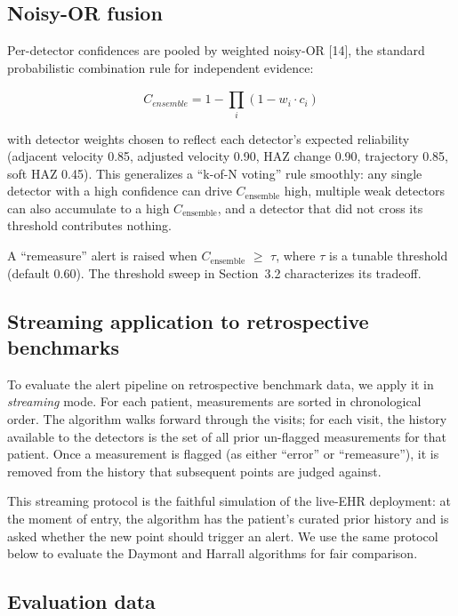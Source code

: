 \documentclass[11pt]{article}
\begin{document}
\subsection{Noisy-OR fusion}\label{noisy-or-fusion}

Per-detector confidences are pooled by weighted noisy-OR [14], the standard probabilistic combination rule for independent evidence:

\[C_{ensemble} = 1 - \prod_{i}^{}\left( 1 - w_{i} \cdot c_{i} \right)\]

with detector weights chosen to reflect each detector's expected reliability (adjacent velocity 0.85, adjusted velocity 0.90, HAZ change 0.90, trajectory 0.85, soft HAZ 0.45). This generalizes a ``k-of-N voting'' rule smoothly: any single detector with a high confidence can drive \(C_{\mathrm{ensemble}}\) high, multiple weak detectors can also accumulate to a high \(C_{\mathrm{ensemble}}\), and a detector that did not cross its threshold contributes nothing.

A ``remeasure'' alert is raised when \(C_{\mathrm{ensemble}}\) \(\ge\) \(\tau\), where \(\tau\) is a tunable threshold (default 0.60). The threshold sweep in Section~3.2 characterizes its tradeoff.

\subsection{Streaming application to retrospective benchmarks}\label{streaming-application-to-retrospective-benchmarks}

To evaluate the alert pipeline on retrospective benchmark data, we apply it in \emph{streaming} mode. For each patient, measurements are sorted in chronological order. The algorithm walks forward through the visits; for each visit, the history available to the detectors is the set of all prior un-flagged measurements for that patient. Once a measurement is flagged (as either ``error'' or ``remeasure''), it is removed from the history that subsequent points are judged against.

This streaming protocol is the faithful simulation of the live-EHR deployment: at the moment of entry, the algorithm has the patient's curated prior history and is asked whether the new point should trigger an alert. We use the same protocol below to evaluate the Daymont and Harrall algorithms for fair comparison.

\subsection{Evaluation data}\label{evaluation-data}
\end{document}
